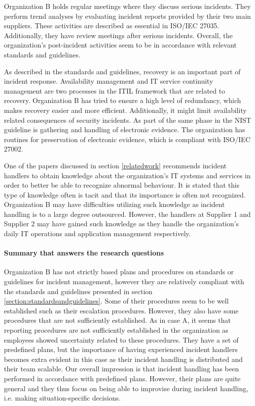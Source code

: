 Organization B holds regular meetings where they discuss serious incidents. They perform trend analyses by evaluating incident reports provided by their two main suppliers. These activities are described as essential in ISO/IEC 27035. Additionally, they have review meetings after serious incidents. Overall, the organization's post-incident activities seem to be in accordance with relevant standards and guidelines.

As described in the standards and guidelines, recovery is an important part of incident response. Availability management and IT service continuity management are two processes in the ITIL framework that are related to recovery. Organization B has tried to ensure a high level of redundancy, which makes recovery easier and more efficient. Additionally, it might limit availability related consequences of security incidents. As part of the same phase in the NIST guideline is gathering and handling of electronic evidence. The organization has routines for preservation of electronic evidence, which is compliant with ISO/IEC 27002.

One of the papers discussed in section \ref{relatedwork} recommends incident handlers to obtain knowledge about the organization's IT systems and services in order to better be able to recognize abnormal behaviour. It is stated that this type of knowledge often is tacit and that its importance is often not recognized. Organization B may have difficulties utilizing such knowledge as incident handling is to a large degree outsourced. However, the handlers at Supplier 1 and Supplier 2 may have gained such knowledge as they handle the organization's daily IT operations and application management respectively. %

\paragraph{Summary that answers the research questions}
Organization B has not strictly based plans and procedures on standards or guidelines for incident management, however they are relatively compliant with the standards and guidelines presented in section \ref{section:standardsandguidelines}. Some of their procedures seem to be well established such as their escalation procedures. However, they also have some procedures that are not sufficiently established. As in case A, it seems that reporting procedures are not sufficiently established in the organization as employees showed uncertainty related to these procedures. They have a set of predefined plans, but the importance of having experienced incident handlers becomes extra evident in this case as their incident handling is distributed and their team scalable. Our overall impression is that incident handling has been performed in accordance with predefined plans. However, their plans are quite general and they thus focus on being able to improvise during incident handling, i.e. making situation-specific decisions.

